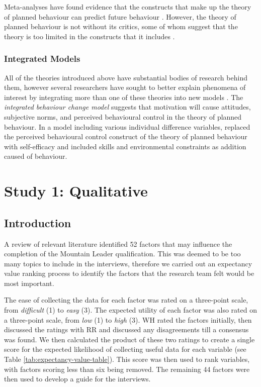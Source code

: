 \documentclass[
  12pt,
  a4paper,
]{book}
\begin{document}
Meta-analyses have found evidence that the constructs that make up the theory of planned behaviour can predict future behaviour \citep{Armitage2001, Hagger2002}. However, the theory of planned behaviour is not without its critics, some of whom suggest that the theory is too limited in the constructs that it includes \citep[cf.~][]{Sniehotta2014}.

\hypertarget{integrated-models}{%
\subsection{Integrated Models}\label{integrated-models}}

All of the theories introduced above have substantial bodies of research behind them, however several researchers have sought to better explain phenomena of interest by integrating more than one of these theories into new models \citep[e.g.,][]{Fishbein2000, Hagger2009, Hagger2014, Hamilton2017}. The \emph{integrated behaviour change model} \citep{Hagger2009, Hagger2014, Hamilton2017} suggests that motivation will cause attitudes, subjective norms, and perceived behavioural control in the theory of planned behaviour. In a model including various individual difference variables, \citet{Fishbein2000} replaced the perceived behavioural control construct of the theory of planned behaviour with self-efficacy \citep[n.b.,][ suggested that perceived behavioural control is similar to the construct of \emph{self-efficacy}]{Ajzen1991} and included skills and environmental constraints as addition caused of behaviour.

\hypertarget{ml-qualitative}{%
\chapter{Study 1: Qualitative}\label{ml-qualitative}}

\hypertarget{introduction}{%
\section{Introduction}\label{introduction}}

A review of relevant literature identified 52 factors that may influence the completion of the Mountain Leader qualification. This was deemed to be too many topics to include in the interviews, therefore we carried out an expectancy value ranking process to identify the factors that the research team felt would be most important.

The ease of collecting the data for each factor was rated on a three-point scale, from \emph{difficult} (1) to \emph{easy} (3). The expected utility of each factor was also rated on a three-point scale, from \emph{low} (1) to \emph{high} (3). WH rated the factors initially, then discussed the ratings with RR and discussed any disagreements till a consensus was found. We then calculated the product of these two ratings to create a single score for the expected likelihood of collecting useful data for each variable (see Table \ref{tab:expectancy-value-table}). This score was then used to rank variables, with factors scoring less than six being removed. The remaining 44 factors were then used to develop a guide for the interviews.
\end{document}
